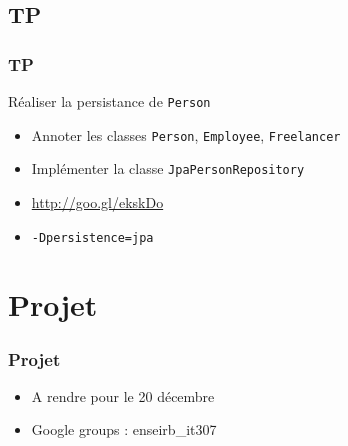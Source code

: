 \documentclass[t,12pt]{beamer}
\begin{document}
\subsection{TP}
\begin{frame}
	\frametitle{TP}

	\begin{block}{R\'ealiser la persistance de \lstinline{Person}}
		\begin{itemize}
			\item Annoter les classes \lstinline{Person}, \lstinline{Employee}, \lstinline{Freelancer}
			\item Impl\'ementer la classe \lstinline{JpaPersonRepository}
			\item \url{http://goo.gl/ekskDo}
			\item \lstinline{-Dpersistence=jpa}
		\end{itemize}
	\end{block}

\end{frame}

\section{Projet}

\begin{frame}
	\frametitle{Projet}

	\begin{block}{}
		\begin{itemize}
			\item A rendre pour le 20 d\'ecembre
			\item Google groups : enseirb\_it307
		\end{itemize}
	\end{block}
\end{frame}
\end{document}
